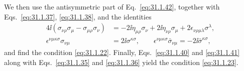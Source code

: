 We then use the antisymmetric part of Eq.~\eqref{eq:31.1.42}, together with
Eqs.~\eqref{eq:31.1.37}, \eqref{eq:31.1.38}, and the identities
\[
  \begin{aligned}
  4\ii(\sigma_{\nu\rho}\sigma_\mu-\sigma_{\mu\rho}\sigma_\nu)
  &=-2\ii\eta_{\mu\rho}\sigma_\nu
    +2\ii\eta_{\nu\rho}\sigma_\mu
    +2\epsilon_{\nu\rho\mu\lambda}\sigma^\lambda,\\
  \epsilon^{\nu\mu\kappa\sigma}\sigma_{\nu\mu}
  &=2\ii\sigma^{\kappa\sigma},
  \qquad
  \epsilon^{\nu\mu\kappa\sigma}\bar\sigma_{\nu\mu}
  =-2\ii\bar\sigma^{\kappa\sigma},
  \end{aligned}
\]
and find the condition \eqref{eq:31.1.22}. Finally,
Eqs.~\eqref{eq:31.1.40} and \eqref{eq:31.1.41}\hfil\break
along with
Eqs.~\eqref{eq:31.1.35} and \eqref{eq:31.1.36} yield the condition
\eqref{eq:31.1.23}.
